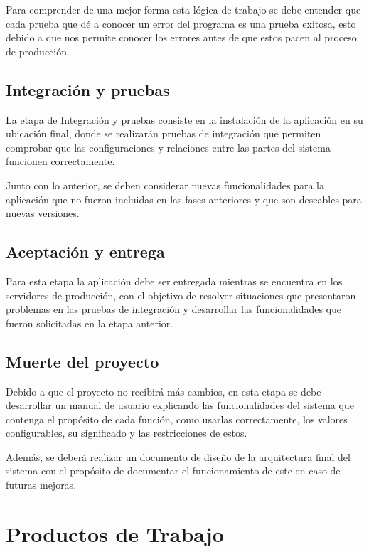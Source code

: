 Para comprender de una mejor forma esta lógica de trabajo se debe entender que cada prueba que dé a conocer un error del programa es una prueba exitosa, esto debido a que nos permite conocer los errores antes de que estos pacen al proceso de producción. 

\subsection{Integración y pruebas}

La etapa de Integración y pruebas consiste en la instalación de la aplicación en su ubicación final, donde se realizarán pruebas de integración que permiten comprobar que las configuraciones y relaciones entre las partes del sistema funcionen correctamente. 

Junto con lo anterior, se deben considerar nuevas funcionalidades para la aplicación que no fueron incluidas en las fases anteriores y que son deseables para nuevas versiones.

\subsection{Aceptación y entrega}

Para esta etapa la aplicación debe ser entregada mientras se encuentra en los servidores de producción, con el objetivo de resolver situaciones que presentaron problemas en las pruebas de integración y desarrollar las funcionalidades que fueron solicitadas en la etapa anterior. 

\subsection{Muerte del proyecto}

Debido a que el proyecto no recibirá más cambios, en esta etapa se debe desarrollar un manual de usuario explicando las funcionalidades del sistema que contenga el propósito de cada función, como usarlas correctamente, los valores configurables, su significado y las restricciones de estos.

Además, se deberá realizar un documento de diseño de la arquitectura final del sistema con el propósito de documentar el funcionamiento de este en caso de futuras mejoras. 

\section{Productos de Trabajo}

